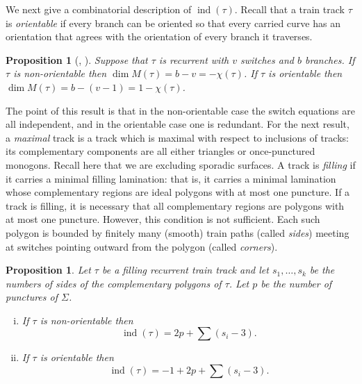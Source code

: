\documentclass[11pt]{article}
\newtheorem{prop}[thm]{Proposition}
\theoremstyle{remark}
\def\ind{\operatorname{ind}}
\begin{document}
We next give a combinatorial description of $\ind(\tau)$.
Recall that a train track $\tau$ is \emph{orientable}
if every branch can be oriented so that every carried
curve has an orientation that agrees with the orientation of every branch it traverses.

\begin{prop}[{\cite[Lemma 3.1]{BB}, \cite[Lemma 2.1.1]{Penner}}]\label{dimensions}
  Suppose that $\tau$ is recurrent with $v$ switches and $b$ branches.
  If $\tau$ is non-orientable then $\dim M(\tau)=b-v=-\chi(\tau)$. If $\tau$
  is orientable then $\dim M(\tau)=b-(v-1)=1-\chi(\tau)$.
\end{prop}


The point of this result is that in the non-orientable case the switch equations are
all independent, and in the orientable case one is redundant.
For the next result, a \emph{maximal} track is a track
which is maximal with respect to inclusions of tracks: its complementary components
are all either triangles or once-punctured monogons. Recall here that we
are excluding sporadic surfaces.
A track is \emph{filling} if it
carries a minimal filling lamination: that is, it carries a minimal lamination
whose complementary regions are ideal polygons with at most
one puncture. If a track is filling, it is necessary that all
complementary regions are polygons with at most one puncture. However,
this condition is not sufficient.
Each such polygon is bounded by finitely many (smooth) train paths (called \emph{sides})
meeting at switches pointing outward from the polygon (called \emph{corners}).



\begin{prop}\label{numerology}
Let $\tau$ be a filling recurrent train track and let $s_1, \dots, s_k$ be the numbers of sides of the complementary polygons of $\tau$.
Let $p$ be the number of punctures of $\Sigma$.
\begin{enumerate}[(i)]
\item If $\tau$ is non-orientable then
$$\ind(\tau) = 2p + \sum(s_i - 3).$$

\item If $\tau$ is orientable then
$$\ind(\tau) =-1+ 2p + \sum(s_i -3).$$
\end{enumerate}
\end{prop}
\end{document}
